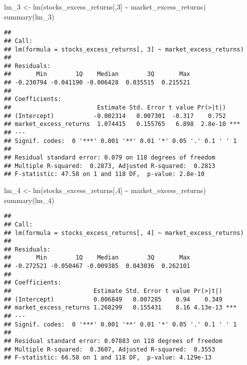 \documentclass[
]{article}
\newenvironment{Shaded}{\begin{snugshade}}{\end{snugshade}}
\newcommand{\DecValTok}[1]{\textcolor[rgb]{0.00,0.00,0.81}{#1}}
\newcommand{\FunctionTok}[1]{\textcolor[rgb]{0.00,0.00,0.00}{#1}}
\newcommand{\NormalTok}[1]{#1}
\newcommand{\OtherTok}[1]{\textcolor[rgb]{0.56,0.35,0.01}{#1}}
\newcommand{\SpecialCharTok}[1]{\textcolor[rgb]{0.00,0.00,0.00}{#1}}
\begin{document}
\begin{Shaded}
\begin{Highlighting}[]
\NormalTok{lm\_3 }\OtherTok{\textless{}{-}} \FunctionTok{lm}\NormalTok{(stocks\_excess\_returns[,}\DecValTok{3}\NormalTok{] }\SpecialCharTok{\textasciitilde{}}\NormalTok{ market\_excess\_returns)}
\FunctionTok{summary}\NormalTok{(lm\_3)}
\end{Highlighting}
\end{Shaded}

\begin{verbatim}
## 
## Call:
## lm(formula = stocks_excess_returns[, 3] ~ market_excess_returns)
## 
## Residuals:
##       Min        1Q    Median        3Q       Max 
## -0.230794 -0.041190 -0.006428  0.035515  0.215521 
## 
## Coefficients:
##                        Estimate Std. Error t value Pr(>|t|)    
## (Intercept)           -0.002314   0.007301  -0.317    0.752    
## market_excess_returns  1.074415   0.155765   6.898  2.8e-10 ***
## ---
## Signif. codes:  0 '***' 0.001 '**' 0.01 '*' 0.05 '.' 0.1 ' ' 1
## 
## Residual standard error: 0.079 on 118 degrees of freedom
## Multiple R-squared:  0.2873, Adjusted R-squared:  0.2813 
## F-statistic: 47.58 on 1 and 118 DF,  p-value: 2.8e-10
\end{verbatim}

\begin{Shaded}
\begin{Highlighting}[]
\NormalTok{lm\_4 }\OtherTok{\textless{}{-}} \FunctionTok{lm}\NormalTok{(stocks\_excess\_returns[,}\DecValTok{4}\NormalTok{] }\SpecialCharTok{\textasciitilde{}}\NormalTok{ market\_excess\_returns)}
\FunctionTok{summary}\NormalTok{(lm\_4)}
\end{Highlighting}
\end{Shaded}

\begin{verbatim}
## 
## Call:
## lm(formula = stocks_excess_returns[, 4] ~ market_excess_returns)
## 
## Residuals:
##       Min        1Q    Median        3Q       Max 
## -0.272521 -0.050467 -0.009385  0.043036  0.262101 
## 
## Coefficients:
##                       Estimate Std. Error t value Pr(>|t|)    
## (Intercept)           0.006849   0.007285    0.94    0.349    
## market_excess_returns 1.268299   0.155431    8.16 4.13e-13 ***
## ---
## Signif. codes:  0 '***' 0.001 '**' 0.01 '*' 0.05 '.' 0.1 ' ' 1
## 
## Residual standard error: 0.07883 on 118 degrees of freedom
## Multiple R-squared:  0.3607, Adjusted R-squared:  0.3553 
## F-statistic: 66.58 on 1 and 118 DF,  p-value: 4.129e-13
\end{verbatim}
\end{document}
